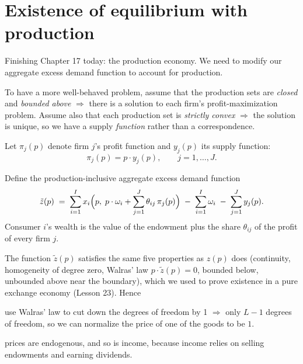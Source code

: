 \documentclass[11pt]{article}
\begin{document}


\section{Existence of equilibrium with production}

Finishing Chapter 17 today: the production economy. We need to modify our aggregate excess
demand function to account for production.

To have a more well-behaved problem, assume that the production sets are \emph{closed} and
\emph{bounded above} $\Rightarrow$ there is a solution to each firm's profit-maximization
problem. Assume also that each production set is \emph{strictly convex}
$\Rightarrow$ the solution is unique, so we have a supply \emph{function} rather than a
correspondence.

Let $\pi_j(p)$ denote firm $j$'s profit function and $y_j(p)$ its supply function:
\[ \pi_j(p)=p\cdot y_j(p), \qquad j=1,\dots,J. \]

Define the production-inclusive aggregate excess demand function
\[ \tilde z(p)\;=\;\sum_{i=1}^{I}x_i\Bigl(p,\;p\cdot\omega_i+\sum_{j=1}^{J}\theta_{ij}\,\pi_j(p)\Bigr)
   \;-\;\sum_{i=1}^{I}\omega_i\;-\;\sum_{j=1}^{J}y_j(p). \]
Consumer $i$'s wealth is the value of the endowment plus the share $\theta_{ij}$ of the profit
of every firm $j$.

The function $\tilde z(p)$ satisfies the same five properties as $z(p)$ does (continuity,
homogeneity of degree zero, Walras' law $p\cdot\tilde z(p)=0$, bounded below, unbounded
above near the boundary), which we used to prove existence in a pure exchange economy
(Lesson 23). Hence
\begin{center}
\end{center}

 use Walras' law to cut down the degrees of freedom by 1 $\Rightarrow$ only
$L-1$ degrees of freedom, so we can normalize the price of one of the goods to be $1$.

 prices are endogenous, and so is income, because income relies on selling
endowments and earning dividends.
\end{document}
